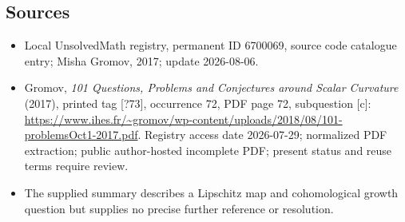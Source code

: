 \documentclass[11pt]{article}
\begin{document}
\subsection{Sources}
\begin{itemize}
\item Local UnsolvedMath registry, permanent ID 6700069, source code catalogue entry; Misha Gromov, 2017; update 2026-08-06.
\item Gromov, \emph{101 Questions, Problems and Conjectures around Scalar Curvature} (2017), printed tag [?73], occurrence 72, PDF page 72, subquestion [c]: \url{https://www.ihes.fr/~gromov/wp-content/uploads/2018/08/101-problemsOct1-2017.pdf}. Registry access date 2026-07-29; normalized PDF extraction; public author-hosted incomplete PDF; present status and reuse terms require review.
\item The supplied summary describes a Lipschitz map and cohomological growth question but supplies no precise further reference or resolution.
\end{itemize}
\end{document}
